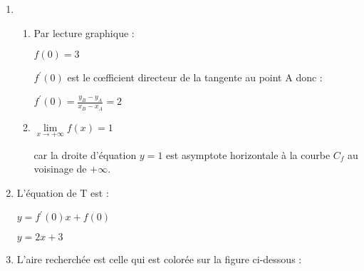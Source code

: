 \begin{corrige}
     \begin{enumerate}
          \item
          \begin{enumerate}[label=\alph*.]
               \item
               Par lecture graphique :
               \par
               $f\left(0\right)=3$
               \par
               $f^{\prime}\left(0\right)$ est le cœfficient directeur de la tangente au point A donc :
               \par
               $f^{\prime}\left(0\right)=\frac{y_{B}-y_{A}}{x_{B}-x_{A}}=2$
               \item
               $\lim\limits_{x\rightarrow +\infty }f\left(x\right)=1$
               \par
               car la droite d'équation $y=1$ est asymptote horizontale à la courbe $C_{f}$ au voisinage de $+\infty $.
 \end{enumerate}

               \item
               L'équation de T est :
               \par
               $y=f^{\prime}\left(0\right)x+f\left(0\right)$
               \par
               $y=2x+3$
               \item
               L'aire recherchée est celle qui est colorée sur la figure ci-dessous :


\end{enumerate}
\end{corrige}
